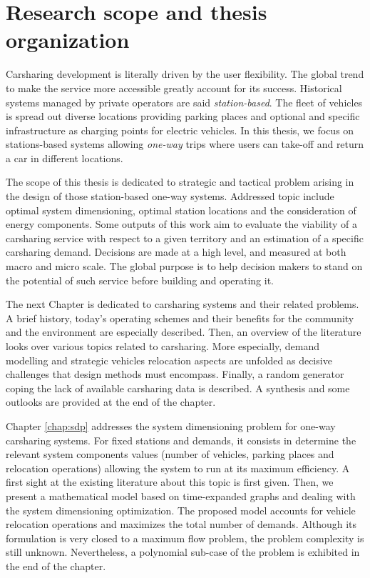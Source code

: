 
\section{Research scope and thesis organization}
Carsharing development is literally driven by the user flexibility.
The global trend to make the service more accessible greatly account for its success.
Historical systems managed by private operators are said \emph{station-based}.
The fleet of vehicles is spread out diverse locations providing parking places and optional and specific infrastructure as charging points for electric vehicles.
In this thesis, we focus on stations-based systems allowing \emph{one-way} trips where users can take-off and return a car in different locations.

\medskip
The scope of this thesis is dedicated to strategic and tactical problem arising in the design of those station-based one-way systems.
Addressed topic include optimal system dimensioning, optimal station locations and the consideration of energy components.
Some outputs of this work aim to evaluate the viability of a carsharing service with respect to a given territory and an estimation of a specific carsharing demand.
Decisions are made at a high level, and measured at both macro and micro scale.
The global purpose is to help decision makers to stand on the potential of such service before building and operating it.

\medskip
The next Chapter is dedicated to carsharing systems and their related problems.
A brief history, today's operating schemes and their benefits for the community and the environment are especially described.
Then, an overview of the literature looks over various topics related to carsharing.
More especially, demand modelling and strategic vehicles relocation aspects are unfolded as decisive challenges that design methods must encompass.
Finally, a random generator coping the lack of available carsharing data is described.
A synthesis and some outlooks are provided at the end of the chapter.


\medskip
Chapter \ref{chap:sdp} addresses the system dimensioning problem for one-way carsharing systems.
For fixed stations and demands, it consists in determine the relevant system components values (number of vehicles, parking places and relocation operations) allowing the system to run at its maximum efficiency.
A first sight at the existing literature about this topic is first given.
Then, we present a mathematical model based on time-expanded graphs and dealing with the system dimensioning optimization.
The proposed model accounts for vehicle relocation operations and maximizes the total number of demands.
Although its formulation is very closed to a maximum flow problem, the problem complexity is still unknown.
Nevertheless, a polynomial sub-case of the problem is exhibited in the end of the chapter.

